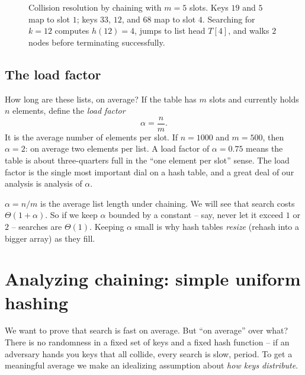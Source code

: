 \begin{figure}[h]
\caption{Collision resolution by chaining with $m=5$ slots. Keys $19$ and $5$ map to slot $1$; keys $33$, $12$, and $68$ map to slot $4$. Searching for $k=12$ computes $h(12)=4$, jumps to list head $T[4]$, and walks $2$ nodes before terminating successfully.}
\label{ch11:chaining-picture}
\end{figure}

\subsection{The load factor}

How long are these lists, on average? If the table has $m$ slots and currently holds $n$ elements, define the \emph{load factor}
\[
  \alpha = \frac{n}{m}.
\]
It is the average number of elements per slot. If $n = 1000$ and $m = 500$, then $\alpha = 2$: on average two elements per list. A load factor of $\alpha = 0.75$ means the table is about three-quarters full in the ``one element per slot'' sense. The load factor is the single most important dial on a hash table, and a great deal of our analysis is analysis of $\alpha$.

\begin{focusbox}
$\alpha = n/m$ is the average list length under chaining. We will see that search costs $\Theta(1 + \alpha)$. So if we keep $\alpha$ bounded by a constant -- say, never let it exceed $1$ or $2$ -- searches are $\Theta(1)$. Keeping $\alpha$ small is why hash tables \emph{resize} (rehash into a bigger array) as they fill.
\end{focusbox}

\section{Analyzing chaining: simple uniform hashing}

We want to prove that search is fast on average. But ``on average'' over what? There is no randomness in a fixed set of keys and a fixed hash function -- if an adversary hands you keys that all collide, every search is slow, period. To get a meaningful average we make an idealizing assumption about \emph{how keys distribute}.

